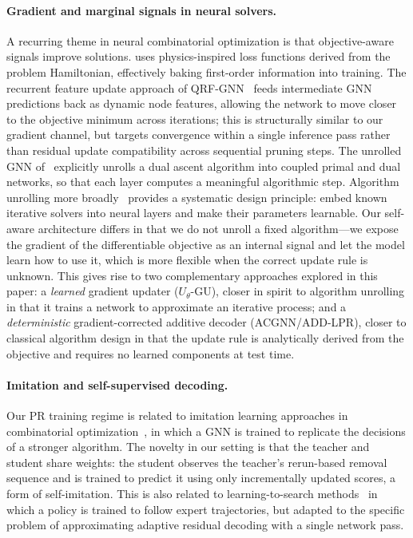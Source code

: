 \documentclass[11pt]{article}
\newcommand{\change}[1]{{\color{red}#1}}
\theoremstyle{plain}
\theoremstyle{definition}
\theoremstyle{remark}
\begin{document}
\paragraph{Gradient and marginal signals in neural solvers.}
A recurring theme in neural combinatorial optimization is that objective-aware
signals improve solutions. \citet{schuetz2022} uses physics-inspired loss functions
derived from the problem Hamiltonian, effectively baking first-order information into
training. The recurrent feature update approach of QRF-GNN~\citep{gaile2024} feeds
intermediate GNN predictions back as dynamic node features, allowing the network to
move closer to the objective minimum across iterations; this is structurally similar
to our gradient channel, but targets convergence within a single inference pass
rather than residual update compatibility across sequential pruning steps. The
unrolled GNN of~\citet{hadou2024} explicitly unrolls a dual ascent algorithm into
coupled primal and dual networks, so that each layer computes a meaningful
algorithmic step. Algorithm unrolling more broadly~\citep{monga2021} provides a
systematic design principle: embed known iterative solvers into neural layers and
make their parameters learnable. Our self-aware architecture differs in that we do
not unroll a fixed algorithm---we expose the gradient of the differentiable objective
as an internal signal and let the model learn how to use it, which is more flexible
when the correct update rule is unknown\change{. This gives rise to two complementary
  approaches explored in this paper: a \emph{learned} gradient updater ($U_\theta$-GU),
  closer in spirit to algorithm unrolling in that it trains a network to approximate an
  iterative process; and a \emph{deterministic} gradient-corrected additive decoder
  (ACGNN/ADD-LPR),
  closer to classical algorithm design in that the update rule is analytically derived
from the objective and requires no learned components at test time.}

\paragraph{Imitation and self-supervised decoding.}
Our \change{PR} training regime is related to imitation learning approaches in
combinatorial optimization~\citep{liu2021}, in which a GNN is trained to replicate
the decisions of a stronger algorithm. The novelty in our setting is that the teacher
and student share weights: the student observes the teacher's rerun-based removal
sequence and is trained to predict it using only incrementally updated scores, a form
of self-imitation. This is also related to learning-to-search
methods~\citep{bengio2021} in which a policy is trained to follow expert
trajectories, but adapted to the specific problem of approximating adaptive residual
decoding with a single network pass.
\end{document}

